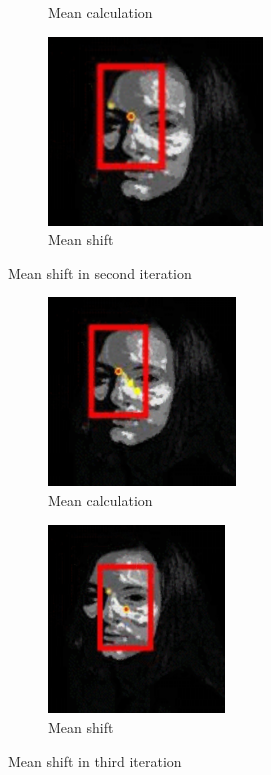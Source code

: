 \documentclass[11pt,a4paper]{article}
\begin{document}
\begin{itemize}
\begin{itemize}
\begin{figure}[h!]
\begin{subfigure}{0.5\textwidth}
\caption{Mean calculation}
\end{subfigure}
\begin{subfigure}{0.5\textwidth}
\includegraphics[width=0.9\linewidth, height=5cm]{ms2.png}
\caption{Mean shift}
\end{subfigure}
 \caption{Mean shift in second iteration}
\end{figure}
\begin{figure}[h!]
 \begin{subfigure}{0.5\textwidth}
\includegraphics[width=0.9\linewidth, height=5cm]{mc3.png} 
\caption{Mean calculation}
\end{subfigure}
\begin{subfigure}{0.5\textwidth}
\includegraphics[width=0.9\linewidth, height=5cm]{ms3.png}
\caption{Mean shift}
\end{subfigure}
 \caption{Mean shift in third iteration}
\end{figure}
\begin{figure}[h!]
 \begin{subfigure}{0.5\textwidth}

\end{subfigure}
\end{figure}
\end{itemize}
\end{itemize}
\end{document}
